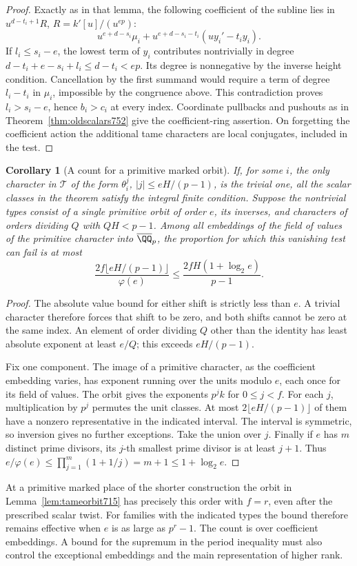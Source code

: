 \documentclass[a4paper,11pt]{article}
\newtheorem{corollary}[proposition]{Corollary}
\theoremstyle{definition}
\theoremstyle{remark}
\numberwithin{equation}{section}
\begin{document}
\begin{proof}
Exactly as in that lemma, the following coefficient of the
subline lies in \(u^{d-t_i+1}R\), \(R=k'[u]/(u^{ep})\):
\[
       u^{e+d-s_i}\mu_i+
              u^{e+d-s_i-t_i}(u y_i'-t_i y_i).
\]
If \(l_i\le s_i-e\), the lowest term of \(y_i\) contributes
nontrivially in degree \(d-t_i+e-s_i+l_i\le d-t_i<ep\).
Its degree is nonnegative by the inverse height condition.
Cancellation by the first summand would require a term of
degree \(l_i-t_i\) in \(\mu_i\), impossible by the congruence
above. This contradiction proves \(l_i>s_i-e\), hence
\(b_i>c_i\) at every index. Coordinate pullbacks and pushouts
as in Theorem~\ref{thm:oldscalars752} give the coefficient-ring
assertion. On forgetting the coefficient action the additional
tame characters are local conjugates, included in the test.
\end{proof}

\begin{corollary}[A count for a primitive marked orbit]
\leavevmode\label{cor:primitiveorbit753}
If, for some \(i\), the only character in \(\mathcal T\) of the
form \(\theta_i^j\), \(|j|\le eH/(p-1)\), is the trivial one,
all the scalar classes in the theorem satisfy the integral
finite condition. Suppose the nontrivial types consist of a
single primitive orbit of order \(e\), its inverses, and
characters of orders dividing \(Q\) with \(QH<p-1\).
Among all embeddings of the field of values of the primitive
character into \(\overline{\QQ}_p\), the proportion for which
this vanishing test can fail is at most
\[
             \frac{2f\lfloor eH/(p-1)\rfloor}{\varphi(e)}
                  \le\frac{2 f H(1+\log_2 e)}{p-1}.
\]
\end{corollary}
\begin{proof}
The absolute value bound for either shift is strictly less
than \(e\). A trivial character therefore forces that shift
to be zero, and both shifts cannot be zero at the same index.
An element of order dividing \(Q\) other than the identity
has least absolute exponent at least \(e/Q\); this exceeds
\(eH/(p-1)\).

Fix one component. The image of a primitive character, as the
coefficient embedding varies, has exponent running over the
units modulo \(e\), each once for its field of values. The
orbit gives the exponents \(p^j k\) for \(0\le j<f\). For each
\(j\), multiplication by \(p^j\) permutes the unit classes.
At most \(2\lfloor eH/(p-1)\rfloor\) of them have a nonzero
representative in the indicated interval. The interval is
symmetric, so inversion gives no further exceptions. Take the
union over \(j\). Finally if \(e\) has \(m\) distinct prime
divisors, its \(j\)-th smallest prime divisor is at least
\(j+1\). Thus
\(e/\varphi(e)\le\prod_{j=1}^m(1+1/j)=m+1\le1+\log_2 e\).
\end{proof}
At a primitive marked place of the shorter construction the
orbit in Lemma~\ref{lem:tameorbit715} has precisely this order
with \(f=r\), even after the prescribed scalar twist. For
families with the indicated types the bound therefore remains
effective when \(e\) is as large as \(p^r-1\). The count is
over coefficient embeddings. A bound for the supremum in the
period inequality must also control the exceptional embeddings
and the main representation of higher rank.
\clearpage
\end{document}
